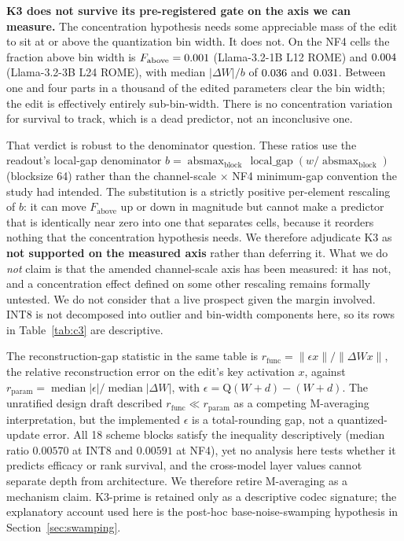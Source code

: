 \documentclass[preprint,12pt]{elsarticle}
\begin{document}
\textbf{K3 does not survive its pre-registered gate on the axis we can measure.} The concentration hypothesis needs
some appreciable mass of the edit to sit at or above the quantization bin width. It does
not. On the NF4 cells the fraction above bin width is $F_{\mathrm{above}} =
0.001{}$ (Llama-3.2-1B L12 ROME) and $0.004{}$
(Llama-3.2-3B L24 ROME), with median $|\Delta W|/b$ of
$0.036{}$ and $0.031{}$. Between one and
four parts in a thousand of the edited parameters clear the bin width; the edit is
effectively entirely sub-bin-width. There is no concentration variation for survival to
track, which is a dead predictor, not an inconclusive one.

That verdict is robust to the denominator question. These ratios use the readout's
local-gap denominator
$b=\operatorname{absmax}_{\mathrm{block}}\,\operatorname{local\_gap}(w/\operatorname{absmax}_{\mathrm{block}})$
(blocksize 64) rather than the channel-scale $\times$ NF4 minimum-gap convention the
study had intended. The substitution is a strictly positive per-element rescaling of
$b$: it can move $F_{\mathrm{above}}$ up or down in magnitude but cannot make a
predictor that is identically near zero into one that separates cells, because it
reorders nothing that the concentration hypothesis needs. We therefore adjudicate K3 as
\textbf{not supported on the measured axis} rather than deferring it. What we do \emph{not}
claim is that the amended channel-scale axis has been measured: it has not, and a
concentration effect defined on some other rescaling remains formally untested. We do
not consider that a live prospect given the margin involved. INT8 is not decomposed into
outlier and bin-width components here, so its rows in Table~\ref{tab:c3} are descriptive.

The reconstruction-gap statistic in the same table is
$r_{\mathrm{func}}=\|\epsilon x\|/\|\Delta W x\|$, the relative reconstruction error on
the edit's key activation $x$, against
$r_{\mathrm{param}}=\operatorname{median}|\epsilon|/\operatorname{median}|\Delta W|$,
with $\epsilon = \mathrm{Q}(W{+}d) - (W{+}d)$. The unratified design draft described
$r_{\mathrm{func}} \ll r_{\mathrm{param}}$ as a competing M-averaging interpretation,
but the implemented $\epsilon$ is a total-rounding gap, not a quantized-update error.
All 18 scheme blocks satisfy the inequality descriptively (median ratio $0.00570$ at
INT8 and $0.00591$ at NF4), yet no analysis here tests whether it predicts efficacy or
rank survival, and the cross-model layer values cannot separate depth from architecture.
We therefore retire M-averaging as a mechanism claim. K3-prime is retained only as a
descriptive codec signature; the explanatory account used here is the post-hoc
base-noise-swamping hypothesis in Section~\ref{sec:swamping}.
\end{document}
